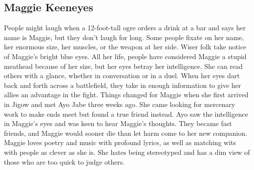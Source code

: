 \documentclass[10pt,a4,twoside,twocolumn,openany,nodeprecatedcode]{dndbook}
\begin{document}
\subsection{Maggie Keeneyes}
People might laugh when a 12-foot-tall ogre orders a drink at a bar and says her name is Maggie, but they don't laugh for long. Some people fixate on her name, her enormous size, her muscles, or the weapon at her side. Wiser folk take notice of Maggie's bright blue eyes. All her life, people have considered Maggie a stupid meathead because of her size, but her eyes betray her intelligence. She can read others with a glance, whether in conversation or in a duel. When her eyes dart back and forth across a battlefield, they take in enough information to give her allies an advantage in the fight.
Things changed for Maggie when she first arrived in Jigow and met Ayo Jabe three weeks ago. She came looking for mercenary work to make ends meet but found a true friend instead. Ayo saw the intelligence in Maggie's eyes and was keen to hear Maggie's thoughts. They became fast friends, and Maggie would sooner die than let harm come to her new companion.
Maggie loves poetry and music with profound lyrics, as well as matching wits with people as clever as she is. She hates being stereotyped and has a dim view of those who are too quick to judge others.
\end{document}
